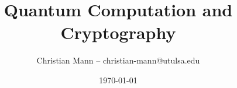\documentclass[12pt]{beamer}
\title[Introduction to Cryptography]{Quantum Computation and Cryptography}
\author{Christian Mann -- christian-mann@utulsa.edu}
\institute{University of Tulsa\\
Tulsa, Oklahoma 74104}
\date{\today}
\begin{document}
\lstset{
language=python,                %
showspaces=false,               %
showstringspaces=false,         %
showtabs=false,                 %
tabsize=4,	                %
}

\newtheorem{mydef}{Definition}

\newcommand{\ket}[1]{\ensuremath{|#1\rangle}}


\begin{frame}
\titlepage
\end{frame}

\end{document}
